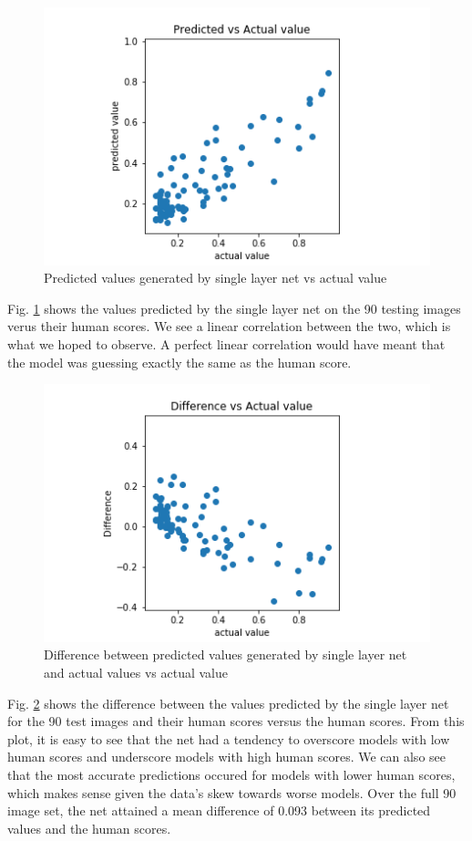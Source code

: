 \documentclass[conference]{IEEEtran}
\begin{document}
\begin{figure}[htbp]
\centerline{\includegraphics[width=0.75\linewidth]{./Images/SinglePredictedVAct.png}}
\caption{Predicted values generated by single layer net vs actual value}
\label{fig:SinglePredictedVAct}
\end{figure}

Fig. \ref{fig:SinglePredictedVAct} shows the values predicted by the single layer net on the 90 testing images verus their human scores. We see a linear correlation between the two, which is what we hoped to observe. A perfect linear correlation would have meant that the model was guessing exactly the same as the human score.

\begin{figure}[htbp]
\centerline{\includegraphics[width=0.75\linewidth]{./Images/SingleDiffVAct.png}}
\caption{Difference between predicted values generated by single layer net and actual values vs actual value}
\label{fig:SingleDiffVAct}
\end{figure}

Fig. \ref{fig:SingleDiffVAct} shows the difference between the values predicted by the single layer net for the 90 test images and their human scores versus the human scores. From this plot, it is easy to see that the net had a tendency to overscore models with low human scores and underscore models with high human scores. We can also see that the most accurate predictions occured for models with lower human scores, which makes sense given the data's skew towards worse models. Over the full 90 image set, the net attained a mean difference of 0.093 between its predicted values and the human scores.
\end{document}
